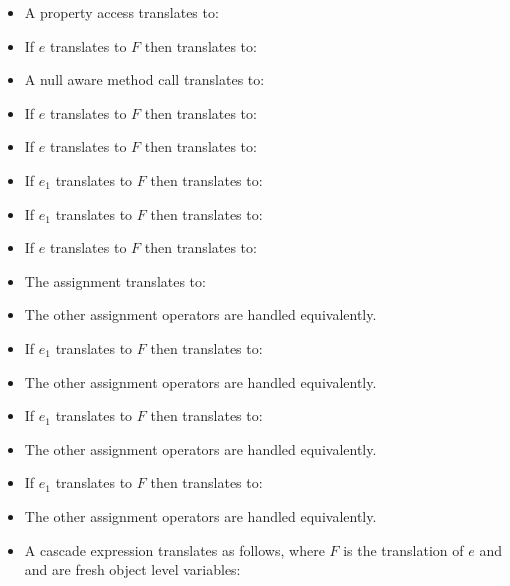 \documentclass[makeidx]{article}
\begin{document}
{\begin{itemize}
\item A property access  translates to:
\item If $e$ translates to $F$ then  translates to:
\item A null aware method call  translates to:
\item If $e$ translates to $F$ then  translates to:
\item If $e$ translates to $F$ then  translates to:
\item If $e_1$ translates to $F$ then  translates to:
\item If $e_1$ translates to $F$ then  translates to:
\item If $e$ translates to $F$ then  translates to:
\item The assignment  translates to:
\item The other assignment operators are handled equivalently.
\item If $e_1$ translates to $F$ then  translates to:
\item The other assignment operators are handled equivalently.
\item If $e_1$ translates to $F$ then  translates to:
\item The other assignment operators are handled equivalently.
\item If $e_1$ translates to $F$ then  translates to:
\item The other assignment operators are handled equivalently.
\item A cascade expression  translates as follows, where $F$ is the
  translation of $e$ and   and  are fresh object level variables:

\end{itemize}}
\end{document}
